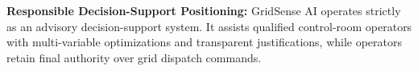 \textbf{Responsible Decision-Support Positioning:} GridSense AI operates strictly as an advisory decision-support system. It assists qualified control-room operators with multi-variable optimizations and transparent justifications, while operators retain final authority over grid dispatch commands.
